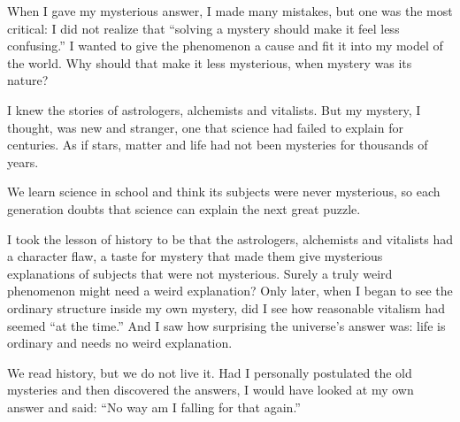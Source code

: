 
When I gave my mysterious answer, I made many mistakes, but one was the most critical: I did not realize that ``solving a mystery should make it feel less confusing.'' I wanted to give the phenomenon a cause and fit it into my model of the world. Why should that make it less mysterious, when mystery was its nature? 

I knew the stories of astrologers, alchemists and vitalists. But my mystery, I thought, was new and stranger, one that science had failed to explain for centuries. As if stars, matter and life had not been mysteries for thousands of years.

We learn science in school and think its subjects were never mysterious, so each generation doubts that science can explain the next great puzzle. 

I took the lesson of history to be that the astrologers, alchemists and vitalists had a character flaw, a taste for mystery that made them give mysterious explanations of subjects that were not mysterious. Surely a truly weird phenomenon might need a weird explanation? Only later, when I began to see the ordinary structure inside my own mystery, did I see how reasonable vitalism had seemed ``at the time.'' And I saw how surprising the universe's answer was: life is ordinary and needs no weird explanation. 

We read history, but we do not live it. Had I personally postulated the old mysteries and then discovered the answers, I would have looked at my own answer and said: ``No way am I falling for that again.'' 
